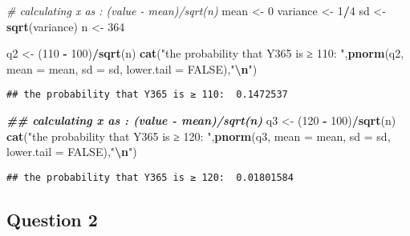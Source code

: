 \documentclass[
]{article}
\newenvironment{Shaded}{\begin{snugshade}}{\end{snugshade}}
\newcommand{\AttributeTok}[1]{\textcolor[rgb]{0.13,0.29,0.53}{#1}}
\newcommand{\CommentTok}[1]{\textcolor[rgb]{0.56,0.35,0.01}{\textit{#1}}}
\newcommand{\ConstantTok}[1]{\textcolor[rgb]{0.56,0.35,0.01}{#1}}
\newcommand{\DecValTok}[1]{\textcolor[rgb]{0.00,0.00,0.81}{#1}}
\newcommand{\DocumentationTok}[1]{\textcolor[rgb]{0.56,0.35,0.01}{\textbf{\textit{#1}}}}
\newcommand{\FunctionTok}[1]{\textcolor[rgb]{0.13,0.29,0.53}{\textbf{#1}}}
\newcommand{\NormalTok}[1]{#1}
\newcommand{\OtherTok}[1]{\textcolor[rgb]{0.56,0.35,0.01}{#1}}
\newcommand{\SpecialCharTok}[1]{\textcolor[rgb]{0.81,0.36,0.00}{\textbf{#1}}}
\newcommand{\StringTok}[1]{\textcolor[rgb]{0.31,0.60,0.02}{#1}}
\begin{document}
\begin{Shaded}
\begin{Highlighting}[]
\CommentTok{\# calculating x as : (value {-} mean)/sqrt(n)}
\NormalTok{mean }\OtherTok{\textless{}{-}} \DecValTok{0}
\NormalTok{variance }\OtherTok{\textless{}{-}} \DecValTok{1}\SpecialCharTok{/}\DecValTok{4}
\NormalTok{sd }\OtherTok{\textless{}{-}} \FunctionTok{sqrt}\NormalTok{(variance)}
\NormalTok{n }\OtherTok{\textless{}{-}} \DecValTok{364}

\NormalTok{q2 }\OtherTok{\textless{}{-}}\NormalTok{ (}\DecValTok{110} \SpecialCharTok{{-}} \DecValTok{100}\NormalTok{)}\SpecialCharTok{/}\FunctionTok{sqrt}\NormalTok{(n)}
\FunctionTok{cat}\NormalTok{(}\StringTok{"the probability that Y365 is ≥ 110: "}\NormalTok{,}\FunctionTok{pnorm}\NormalTok{(q2, }\AttributeTok{mean =}\NormalTok{ mean, }\AttributeTok{sd =}\NormalTok{ sd, }\AttributeTok{lower.tail =} \ConstantTok{FALSE}\NormalTok{),}\StringTok{"}\SpecialCharTok{\textbackslash{}n}\StringTok{"}\NormalTok{)}
\end{Highlighting}
\end{Shaded}

\begin{verbatim}
## the probability that Y365 is ≥ 110:  0.1472537
\end{verbatim}

\begin{Shaded}
\begin{Highlighting}[]
\DocumentationTok{\#\# calculating x as : (value {-} mean)/sqrt(n)}
\NormalTok{q3 }\OtherTok{\textless{}{-}}\NormalTok{ (}\DecValTok{120} \SpecialCharTok{{-}} \DecValTok{100}\NormalTok{)}\SpecialCharTok{/}\FunctionTok{sqrt}\NormalTok{(n)}
\FunctionTok{cat}\NormalTok{(}\StringTok{"the probability that Y365 is ≥ 120: "}\NormalTok{,}\FunctionTok{pnorm}\NormalTok{(q3, }\AttributeTok{mean =}\NormalTok{ mean, }\AttributeTok{sd =}\NormalTok{ sd, }\AttributeTok{lower.tail =} \ConstantTok{FALSE}\NormalTok{),}\StringTok{"}\SpecialCharTok{\textbackslash{}n}\StringTok{"}\NormalTok{)}
\end{Highlighting}
\end{Shaded}

\begin{verbatim}
## the probability that Y365 is ≥ 120:  0.01801584
\end{verbatim}

\hypertarget{question-2}{%
\subsection{Question 2}\label{question-2}}
\end{document}
